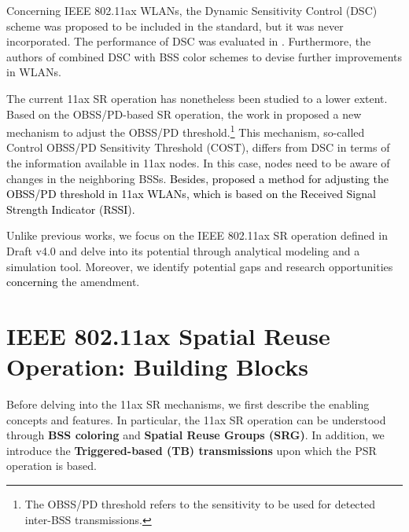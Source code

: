 \documentclass[preprint,12pt]{elsarticle}
\begin{document}
Concerning IEEE 802.11ax WLANs, the Dynamic Sensitivity Control (DSC) scheme was proposed to be included in the standard, but it was never incorporated. The performance of DSC was evaluated in \cite{afaqui2015evaluation, afaqui2016dynamic, kulkarni2015taming}. Furthermore, the authors of \cite{selinis2016evaluation, selinis2017exploiting} combined DSC with BSS color schemes to devise further improvements in WLANs.

The current 11ax SR operation has nonetheless been studied to a lower extent. Based on the OBSS/PD-based SR operation, the work in \cite{selinis2018control} proposed a new mechanism to adjust the OBSS/PD threshold.\footnote{The OBSS/PD threshold refers to the sensitivity to be used for detected inter-BSS transmissions.} This mechanism, so-called Control OBSS/PD Sensitivity Threshold (COST), differs from DSC in terms of the information available in 11ax nodes. In this case, nodes need to be aware of changes in the neighboring BSSs. \textcolor{black}{Besides, \cite{ropitault2018evaluation} proposed a method for adjusting the OBSS/PD threshold in 11ax WLANs, which is based on the Received Signal Strength Indicator (RSSI).}

Unlike previous works, we focus on the IEEE 802.11ax SR operation defined in Draft v4.0 and delve into its potential through analytical modeling and a simulation tool. Moreover, we identify potential gaps and research opportunities \textcolor{black}{concerning} the amendment.

\section{IEEE 802.11ax Spatial Reuse Operation: Building Blocks}
\label{section:enablers_sr_11ax}
Before delving into the 11ax SR mechanisms, we first describe the enabling concepts and features. In particular, the 11ax SR operation can be understood through \textbf{BSS coloring} and \textbf{Spatial Reuse Groups (SRG)}. In addition, we introduce the \textbf{Triggered-based (TB) transmissions} upon which the PSR operation is based.

\end{document}
